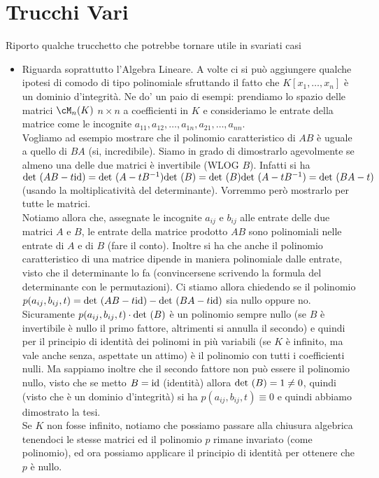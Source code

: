 \documentclass[a4paper,NoNotes,GeneralMath]{stdmdoc}
\theoremstyle{definition}
\begin{document}
	\section {Trucchi Vari}
	Riporto qualche trucchetto che potrebbe tornare utile in svariati casi
	\begin{itemize}
		\item Riguarda soprattutto l'Algebra Lineare. A volte ci si può aggiungere qualche ipotesi di comodo di tipo polinomiale sfruttando il fatto che $K[x_1, \ldots, x_n]$ è un dominio d'integrità. Ne do' un paio di esempi: prendiamo lo spazio delle matrici $\cM_n(K)$ $n \times n$ a coefficienti in $K$ e consideriamo le entrate della matrice come le incognite $a_{11}, a_{12}, \ldots, a_{1n}, a_{21}, \ldots, a_{nn}$. \\
		Vogliamo ad esempio mostrare che il polinomio caratteristico di $AB$ è uguale a quello di $BA$ (si, incredibile). Siamo in grado di dimostrarlo agevolmente se almeno una delle due matrici è invertibile (WLOG $B$). Infatti si ha $\mbox{det }(AB - t \mbox{id}) = \mbox{det }(A - t B^{-1}) \mbox{det }(B) = \mbox{det }(B) \mbox{det }(A - tB^{-1}) = \mbox{det }(BA - t)$ (usando la moltiplicatività del determinante). Vorremmo però mostrarlo per tutte le matrici. \\
		Notiamo allora che, assegnate le incognite $a_{ij}$ e $b_{ij}$ alle entrate delle due matrici $A$ e $B$, le entrate della matrice prodotto $AB$ sono polinomiali nelle entrate di $A$ e di $B$ (fare il conto). Inoltre si ha che anche il polinomio caratteristico di una matrice dipende in maniera polinomiale dalle entrate, visto che il determinante lo fa (convincersene scrivendo la formula del determinante con le permutazioni). Ci stiamo allora chiedendo se il polinomio $p(a_{ij}, b_{ij}, t) = \mbox{det }(AB - t \mbox{id}) - \mbox{det }(BA - t\mbox{id})$ sia nullo oppure no. \\
		Sicuramente $p(a_{ij}, b_{ij}, t) \cdot \mbox{det }(B)$ è un polinomio sempre nullo (se $B$ è invertibile è nullo il primo fattore, altrimenti si annulla il secondo) e quindi per il principio di identità dei polinomi in più variabili (se $K$ è infinito, ma vale anche senza, aspettate un attimo) è il polinomio con tutti i coefficienti nulli. Ma sappiamo inoltre che il secondo fattore non può essere il polinomio nullo, visto che se metto $B = \mbox{id}$ (identità) allora $\mbox{det }(B) = 1 \neq 0$, quindi (visto che è un dominio d'integrità) si ha $p(a_{ij}, b_{ij}, t) \equiv 0$ e quindi abbiamo dimostrato la tesi. \\
		Se $K$ non fosse infinito, notiamo che possiamo passare alla chiusura algebrica tenendoci le stesse matrici ed il polinomio $p$ rimane invariato (come polinomio), ed ora possiamo applicare il principio di identità per ottenere che $p$ è nullo. \\

\end{itemize}
\end{document}
